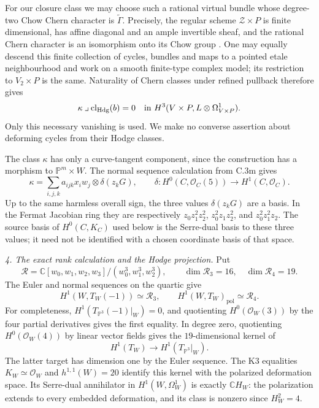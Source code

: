 For our closure class we may choose such a rational
virtual bundle whose degree-two Chow Chern character
is $\widetilde\Gamma$. Precisely, the regular scheme
$\mathcal Z\times P$ is finite dimensional, has affine
diagonal and an ample invertible sheaf, and the rational
Chern character is an isomorphism onto its Chow group
\citep[Lemma 42.58.1, Tag 0FEY]{cyStacksChernObstruction}.
One may equally descend this finite collection of cycles,
bundles and maps to a pointed etale neighbourhood and
work on a smooth finite-type complex model; its restriction
to $V_2\times P$ is the same. Naturality of Chern classes
under refined pullback
\citep[Remark 42.59.9, Tag 0FF8]{cyStacksChernObstruction}
therefore gives
\begin{equation}\label{eq:C3ae-obstruction-zero}
 \kappa\mathbin{\lrcorner}\operatorname{cl}_{\mathrm{Hdg}}(b)
       =0
 \quad\hbox{in }H^3(V\times P,L\otimes\Omega^1_{V\times P}).
\end{equation}
Only this necessary vanishing is used. We make no
converse assertion about deforming cycles from their
Hodge classes.

The class $\kappa$ has only a curve-tangent component,
since the construction has a morphism to
$\mathbb P^m\times W$. The normal sequence calculation
from C.3m gives
\begin{equation}\label{eq:C3ae-kappa}
 \kappa=\sum_{i,j,k}a_{ijk}x_iw_j\otimes\delta(z_kG),
 \qquad
 \delta:H^0(C,\mathcal O_C(5))\longrightarrow H^1(C,\mathcal O_C).
\end{equation}
Up to the same harmless overall sign, the three values
$\delta(z_kG)$ are a basis. In the Fermat Jacobian ring
they are respectively
$z_0z_1^2z_2^2$, $z_0^2z_1z_2^2$, and
$z_0^2z_1^2z_2$. The source basis of $H^0(C,K_C)$
used below is the Serre-dual basis to these three
values; it need not be identified with a chosen
coordinate basis of that space.

\emph{4. The exact rank calculation and the Hodge projection.}
Put
\[
 \mathcal R=\mathbb C[w_0,w_1,w_2,w_3]/(w_0^3,w_1^3,w_2^3),
 \qquad \dim\mathcal R_3=16,\quad\dim\mathcal R_4=19.
\]
The Euler and normal sequences on the quartic give
\[
 H^1(W,T_W(-1))\simeq\mathcal R_3,
 \qquad
 H^1(W,T_W)_{\mathrm{pol}}\simeq\mathcal R_4.
\]
For completeness, $H^1(T_{\mathbb P^3}(-1)|_W)=0$,
and quotienting $H^0(\mathcal O_W(3))$ by the four
partial derivatives gives the first equality. In degree
zero, quotienting $H^0(\mathcal O_W(4))$ by linear
vector fields gives the $19$-dimensional kernel of
\[
                   H^1(T_W)\longrightarrow H^1(T_{\mathbb P^3}|_W).
\]
The latter
target has dimension one by the Euler sequence.
The K3 equalities $K_W\simeq\mathcal O_W$ and
$h^{1,1}(W)=20$ identify this kernel with the
polarized deformation space. Its Serre-dual annihilator
in $H^1(W,\Omega^1_W)$ is exactly $\mathbb C H_W$:
the polarization extends to every embedded deformation,
and its class is nonzero since $H_W^2=4$.

